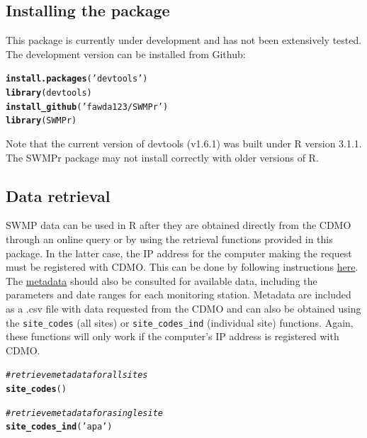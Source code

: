 \documentclass[10pt,letterpaper]{article}\usepackage[]{graphicx}\usepackage[]{color}
\makeatletter
\newcommand{\hlstr}[1]{\textcolor[rgb]{0.192,0.494,0.8}{#1}}%
\newcommand{\hlcom}[1]{\textcolor[rgb]{0.678,0.584,0.686}{\textit{#1}}}%
\newcommand{\hlstd}[1]{\textcolor[rgb]{0.345,0.345,0.345}{#1}}%
\newcommand{\hlkwd}[1]{\textcolor[rgb]{0.737,0.353,0.396}{\textbf{#1}}}%
\newenvironment{kframe}{%
 \def\at@end@of@kframe{}%
 \ifinner\ifhmode%
  \def\at@end@of@kframe{\end{minipage}}%
  \begin{minipage}{\columnwidth}%
 \fi\fi%
 \def\FrameCommand##1{\hskip\@totalleftmargin \hskip-\fboxsep
 \colorbox{shadecolor}{##1}\hskip-\fboxsep
     \hskip-\linewidth \hskip-\@totalleftmargin \hskip\columnwidth}%
 \MakeFramed {\advance\hsize-\width
   \@totalleftmargin\z@ \linewidth\hsize
   \@setminipage}}%
 {\par\unskip\endMakeFramed%
 \at@end@of@kframe}
\newenvironment{knitrout}{}{} %
\makeatother
\begin{document}
\subsection*{Installing the package}

This package is currently under development and has not been extensively tested.  The development version can be installed from Github:

\begin{knitrout}
\color{fgcolor}\begin{kframe}
\begin{alltt}
\hlkwd{install.packages}\hlstd{(}\hlstr{'devtools'}\hlstd{)}
\hlkwd{library}\hlstd{(devtools)}
\hlkwd{install_github}\hlstd{(}\hlstr{'fawda123/SWMPr'}\hlstd{)}
\hlkwd{library}\hlstd{(SWMPr)}
\end{alltt}
\end{kframe}
\end{knitrout}


Note that the current version of devtools (v1.6.1) was built under R version 3.1.1.  The SWMPr package may not install correctly with older versions of R.

\subsection*{Data retrieval}

SWMP data can be used in R after they are obtained directly from the CDMO through an online query or by using the retrieval functions provided in this package.  In the latter case, the IP address for the computer making the request must be registered with CDMO.  This can be done by following instructions \href{http://cdmo.baruch.sc.edu/webservices.cfm}{here}.  The \href{http://cdmo.baruch.sc.edu/data/metadata.cfm}{metadata} should also be consulted for available data, including the parameters and date ranges for each monitoring station.  Metadata are included as a .csv file with data requested from the CDMO and can also be obtained using the \texttt{site\_codes} (all sites) or \texttt{site\_codes\_ind} (individual site) functions.  Again, these functions will only work if the computer's IP address is registered with CDMO. 

\begin{knitrout}
\color{fgcolor}\begin{kframe}
\begin{alltt}
\hlcom{# retrieve metadata for all sites}
\hlkwd{site_codes}\hlstd{()}

\hlcom{# retrieve metadata for a single site}
\hlkwd{site_codes_ind}\hlstd{(}\hlstr{'apa'}\hlstd{)}
\end{alltt}
\end{kframe}
\end{knitrout}
\end{document}
